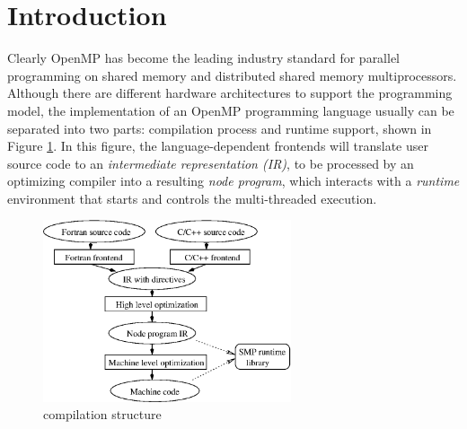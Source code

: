 \section{Introduction}

Clearly OpenMP\cite{Ope00}\cite{Ope02} has become the leading industry
standard for parallel programming on shared memory and distributed
shared memory multiprocessors. Although there are different
hardware architectures to support the programming model, the
implementation of an OpenMP programming language usually can be
separated into two parts: compilation process and runtime support,
shown in Figure \ref{fig:runtime}.
In this figure, the language-dependent frontends will translate user
source code to an \emph{intermediate representation (IR)}, to be
processed by an optimizing compiler into a resulting \emph{node
program}, which interacts with a \emph{runtime} environment that
starts and controls the multi-threaded execution.

\begin{figure}[!h]
  \begin{center}
    \includegraphics[angle=0, width=0.65\textwidth]{runtime.eps}
    \caption{\footnotesize compilation structure}
    \label{fig:runtime}
  \end{center}
\end{figure}





